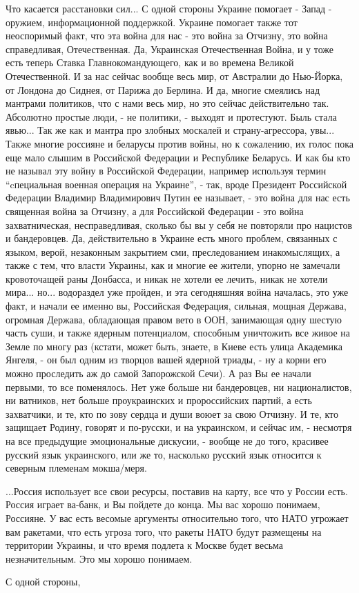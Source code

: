 Что касается расстановки сил... С одной стороны Украине помогает - Запад -
оружием, информационной поддержкой.  Украине помогает также тот неоспоримый
факт, что эта война для нас - это война за Отчизну, это война справедливая,
Отечественная. Да, Украинская Отечественная Война, и у тоже есть теперь Ставка
Главнокомандующего, как и во времена Великой Отечественной. И за нас сейчас
вообще весь мир, от Австралии до Нью-Йорка, от Лондона до Сиднея, от Парижа до
Берлина. И да, многие смеялись над мантрами политиков, что с нами весь мир, но
это сейчас действительно так. Абсолютно простые люди, - не политики, - выходят
и протестуют.  Быль стала явью... Так же как и мантра про злобных москалей и
страну-агрессора, увы...  Также многие россияне и беларусы против войны, но к
сожалению, их голос пока еще мало слышим в Российской Федерации и Республике
Беларусь. И как бы кто не называл эту войну в Российской Федерации, например
используя термин \enquote{cпециальная военная операция на Украине}, - так,
вроде Президент Российской Федерации Владимир Владимирович Путин ее называет, -
это война для нас есть священная война за Отчизну, а для Российской Федерации -
это война захватническая, несправедливая, сколько бы вы у себя не
повторяли про нацистов и бандеровцев. Да, действительно в Украине есть много
проблем, связанных с языком, верой, незаконным закрытием сми, преследованием
инакомыслящих, а также с тем, что власти Украины, как и многие ее жители,
упорно не замечали кровоточащей раны Донбасса, и никак не хотели ее лечить,
никак не хотели мира... но... водораздел уже пройден, и эта сегодняшняя война
началась, это уже факт, и начали ее именно вы, Российская Федерация, сильная,
мощная Держава, огромная Держава, обладающая правом вето в ООН, занимающая одну
шестую часть суши, и также ядерным потенциалом, способным уничтожить все живое
на Земле по многу раз (кстати, может быть, знаете, в Киеве есть улица Академика
Янгеля, - он был одним из творцов вашей ядерной триады, - ну а корни его можно
проследить аж до самой Запорожской Сечи). А раз Вы ее начали первыми, то все
поменялось.  Нет уже больше ни бандеровцев, ни националистов, ни ватников, нет
больше проукраинских и пророссийских партий, а есть захватчики, и те, кто по
зову сердца и души воюет за свою Отчизну. И те, кто защищает Родину, говорят и
по-русски, и на украинском, и сейчас им, - несмотря на все предыдущие
эмоциональные дискусии, - вообще не до того, красивее русский язык украинского,
или же то, насколько русский язык относится к северным племенам мокша/меря.

...Россия использует все свои ресурсы, поставив на карту, все что у России
есть. Россия играет ва-банк, и Вы пойдете до конца. Мы вас хорошо понимаем,
Россияне. У вас есть весомые аргументы относительно того, что НАТО угрожает вам
ракетами, что есть угроза того, что ракеты НАТО будут размещены на территории
Украины, и что время подлета к Москве будет весьма незначительным. Это мы
хорошо понимаем. 

С одной стороны,
